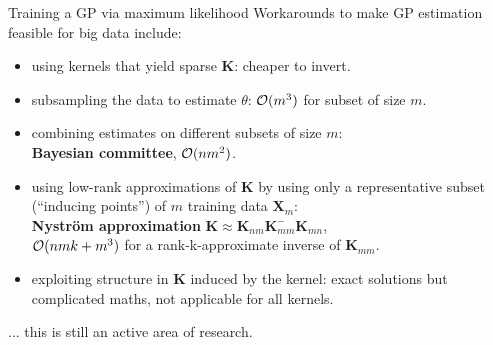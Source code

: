 \documentclass[11pt,compress,t,notes=noshow, xcolor=table]{beamer}
\begin{document}
\begin{vbframe}{Training a GP via maximum likelihood}
Workarounds to make GP estimation feasible for big data include:
\begin{itemize}
\item using kernels that yield sparse $\bm K$: cheaper to invert.
\item subsampling the data to estimate $\theta$: $\mathcal{O}(m^3)$ for subset of size $m$.
\item combining estimates on different subsets of size $m$:\\ \textbf{Bayesian committee}, $\mathcal{O}(n m^2)$.
\item using low-rank approximations of $\bm{K}$ by using only a representative subset (\enquote{inducing points}) of $m$ training data $\bm X_m$:\\ \textbf{Nyström approximation} $\bm K \approx \bm K_{nm} \bm K_{mm}^{-} \bm K_{mn}$,\\ $\mathcal{O}(nmk + m^3)$ for a rank-k-approximate inverse of $\bm K_{mm}$.
\item exploiting structure in $\bm{K}$ induced by the kernel: exact solutions but complicated maths, not  applicable for all kernels.
\end{itemize}

... this is still an active area of research.

\end{vbframe}

% 
% 
% 
% 
% 
% 

\endlecture
\end{document}
